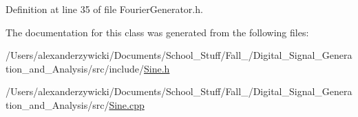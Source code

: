 Definition at line 35 of file Fourier\+Generator.\+h.



The documentation for this class was generated from the following files\+:\begin{DoxyCompactItemize}
\item 
/\+Users/alexanderzywicki/\+Documents/\+School\+\_\+\+Stuff/\+Fall\+\_/\+Digital\+\_\+\+Signal\+\_\+\+Generation\+\_\+and\+\_\+\+Analysis/src/include/\hyperlink{Sine_8h}{Sine.\+h}\item 
/\+Users/alexanderzywicki/\+Documents/\+School\+\_\+\+Stuff/\+Fall\+\_/\+Digital\+\_\+\+Signal\+\_\+\+Generation\+\_\+and\+\_\+\+Analysis/src/\hyperlink{Sine_8cpp}{Sine.\+cpp}\end{DoxyCompactItemize}
